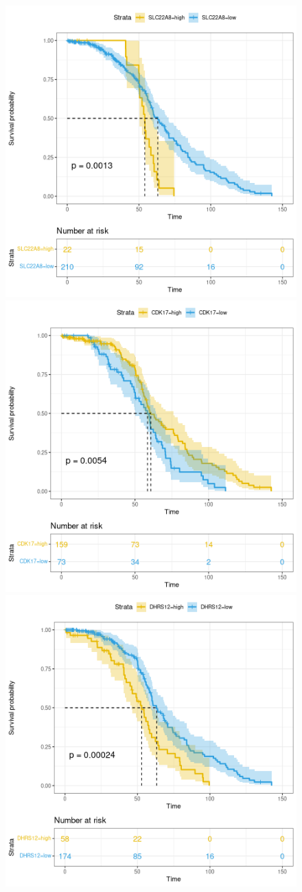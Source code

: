 \documentclass[fleqn,10pt]{SelfArx} %
\begin{document}
\begin{figure}[ht]
\begin{multicols}{2}
		 		\includegraphics[width=0.7\linewidth]{figures/SLC22A8.png}
		 		\includegraphics[width=0.7\linewidth]{figures/CDK17.png}
		 		\includegraphics[width=0.7\linewidth]{figures/DHRS12.png}

\end{multicols}
\end{figure}
\end{document}

